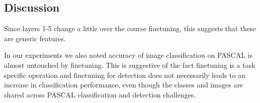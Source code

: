 \subsection{Discussion}
\label{sub:fine-discussion}
Since layers 1-5 change a little over the course finetuning, this suggests that these are generic features. 



In our experiments we also noted accuracy of image classification on PASCAL is almost untouched by finetuning. This is suggestive of the fact finetuning is a task specific operation and finetuning for detection does not necessarily leads to an increase in classification performance, even though the classes and images are shared across PASCAL classification and detection challenges.

